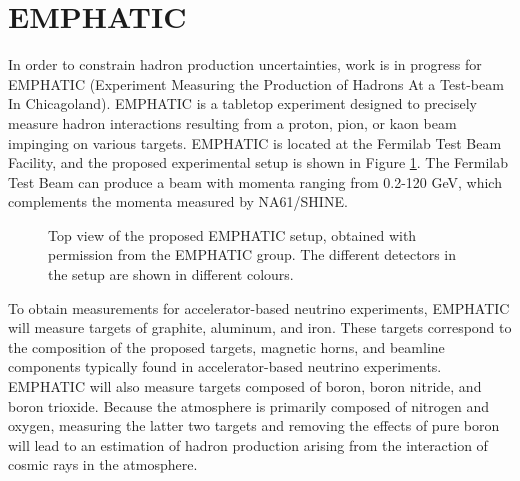  \section{EMPHATIC}

In order to constrain hadron production uncertainties, work is in progress for EMPHATIC (Experiment Measuring the Production of Hadrons At a Test-beam In Chicagoland).
EMPHATIC is a tabletop experiment designed to precisely measure hadron interactions resulting from a proton, pion, or kaon beam impinging on various targets. 
EMPHATIC is located at the Fermilab Test Beam Facility, and the proposed experimental setup is shown in Figure \ref{fig:EMPHATIC}.
The Fermilab Test Beam can produce a beam with momenta ranging from 0.2-120 GeV, which complements the momenta measured by NA61/SHINE.

\begin{figure}[] 
\centering
{}
\caption[Top view of the proposed EMPHATIC setup]{Top view of the proposed EMPHATIC setup, obtained with permission from the EMPHATIC group. The different detectors in the setup are shown in different colours.}
\label{fig:EMPHATIC} 
\end{figure}

To obtain measurements for accelerator-based neutrino experiments, EMPHATIC will measure targets of graphite, aluminum, and iron.
These targets correspond to the composition of the proposed targets, magnetic horns, and beamline components typically found in accelerator-based neutrino experiments.
EMPHATIC will also measure targets composed of boron, boron nitride, and boron trioxide.
Because the atmosphere is primarily composed of nitrogen and oxygen, measuring the latter two targets and removing the effects of pure boron will lead to an estimation of hadron production arising from the interaction of cosmic rays in the atmosphere. 

